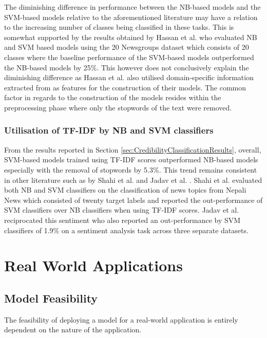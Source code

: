 \documentclass[a4paper,twoside,phd]{BYUPhys}
\begin{document}
The diminishing difference in performance between the NB-based models and the SVM-based models relative to the aforementioned literature may have a relation to the increasing number of classes being classified in these tasks. This is somewhat supported by the results obtained by Hassan et al. \cite{Hassan} who evaluated NB and SVM based models using the 20 Newsgroups dataset \cite{Mitchell} which consists of 20 classes where the baseline performance of the SVM-based models outperformed the NB-based models by 25\%. This however does not conclusively explain the diminishing difference as Hassan et al. also utilised domain-specific information extracted from as features for the construction of their models. The common factor in regards to the construction of the models resides within the preprocessing phase where only the stopwords of the text were removed. \newline

\subsubsection{Utilisation of TF-IDF by NB and SVM classifiers}

From the results reported in Section \ref{sec:CredibilityClassificationResults}, overall, SVM-based models trained using TF-IDF scores outperformed NB-based models especially with the removal of stopwords by 5.3\%. This trend remains consistent in other literature such as by Shahi et al. \cite{Shahi2018} and Jadav et al. \cite{Jadav2016}. Shahi et al. evaluated both NB and SVM classifiers on the classification of news topics from Nepali News which consisted of twenty target labels and reported the out-performance of SVM classifiers over NB classifiers when using TF-IDF scores. Jadav et al. reciprocated this sentiment who also reported an out-performance by SVM classifiers of 1.9\% on a sentiment analysis task across three separate datasets. 



\section{Real World Applications}
\label{sec:RealWorldApplication}

\subsection{Model Feasibility}
\label{sec:ModelFeasibility}
The feasibility of deploying a model for a real-world application is entirely dependent on the nature of the application. \newline
\end{document}
